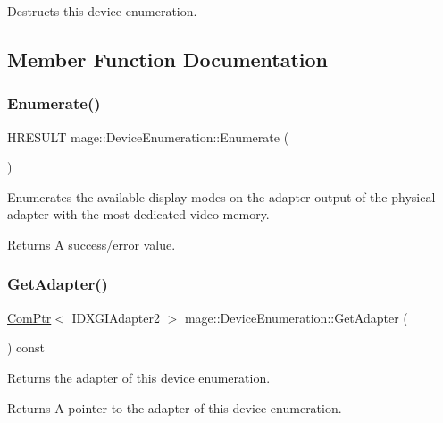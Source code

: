 Destructs this device enumeration. 

\subsection{Member Function Documentation}
\hypertarget{classmage_1_1_device_enumeration_a4fea0ffef733632456b281f74608a239}{}\label{classmage_1_1_device_enumeration_a4fea0ffef733632456b281f74608a239} 
\subsubsection{\texorpdfstring{Enumerate()}{Enumerate()}}
{\footnotesize\ttfamily H\+R\+E\+S\+U\+LT mage\+::\+Device\+Enumeration\+::\+Enumerate (\begin{DoxyParamCaption}{ }\end{DoxyParamCaption})\hspace{0.3cm}{\ttfamily [private]}}

Enumerates the available display modes on the adapter output of the physical adapter with the most dedicated video memory.

\begin{DoxyReturn}{Returns}
A success/error value. 
\end{DoxyReturn}
\hypertarget{classmage_1_1_device_enumeration_ad8a0702abdc70ea8fc1b6e46544839a1}{}\label{classmage_1_1_device_enumeration_ad8a0702abdc70ea8fc1b6e46544839a1} 
\subsubsection{\texorpdfstring{Get\+Adapter()}{GetAdapter()}}
{\footnotesize\ttfamily \hyperlink{namespacemage_ae74f374780900893caa5555d1031fd79}{Com\+Ptr}$<$ I\+D\+X\+G\+I\+Adapter2 $>$ mage\+::\+Device\+Enumeration\+::\+Get\+Adapter (\begin{DoxyParamCaption}{ }\end{DoxyParamCaption}) const}

Returns the adapter of this device enumeration.

\begin{DoxyReturn}{Returns}
A pointer to the adapter of this device enumeration. 
\end{DoxyReturn}
\hypertarget{classmage_1_1_device_enumeration_a533ac2f6ea91604a3ea3cc8d93c3de87}{}\label{classmage_1_1_device_enumeration_a533ac2f6ea91604a3ea3cc8d93c3de87} 
